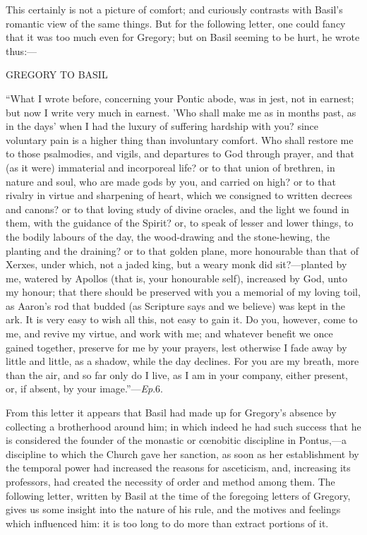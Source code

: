 This certainly is not a picture of comfort; and curiously contrasts
with Basil's romantic view of the same things. But for the following
letter, one could fancy that it was too much even for Gregory; but on
Basil seeming to be hurt, he wrote thus:—

GREGORY TO BASIL

``What I wrote before, concerning your Pontic abode, was in
jest, not in earnest; but now I write very much in earnest. 'Who shall
make me as in months past, as in the days' when I had the luxury of
suffering hardship with you? since voluntary pain is a higher thing
than involuntary comfort. Who shall restore me to those psalmodies,
and vigils, and departures to God through prayer, and that (as it
were) immaterial and incorporeal life? or to that union of brethren,
in nature and soul, who are made gods by you, and
carried on high? or to that rivalry in virtue and sharpening of heart,
which we consigned to written decrees and canons? or to that loving
study of divine oracles, and the light we found in them, with the
guidance of the Spirit? or, to speak of lesser and lower things, to
the bodily labours of the day, the wood-drawing and the stone-hewing,
the planting and the draining? or to that golden plane, more
honourable than that of Xerxes, under which, not a jaded king, but a
weary monk did sit?—planted by me, watered by Apollos (that is, your
honourable self), increased by God, unto my honour; that there should
be preserved with you a memorial of my loving toil, as Aaron's rod
that budded (as Scripture says and we believe) was kept in the ark. It
is very easy to wish all this, not easy to gain it. Do you, however,
come to me, and revive my virtue, and work with me; and whatever
benefit we once gained together, preserve for me by your prayers, lest
otherwise I fade away by little and little, as a shadow, while the day
declines. For you are my breath, more than the air, and so far only do
I live, as I am in your company, either present, or, if absent, by
your image.''—\emph{Ep}.6.

From this letter it appears that Basil had made up for Gregory's
absence by collecting a brotherhood around him; in which indeed he had
such success that he is considered the founder of the monastic or cœnobitic
discipline in Pontus,—a discipline to which the Church gave her
sanction, as soon as her establishment by the temporal power had
increased the reasons for asceticism, and, increasing its professors,
had created the necessity of order and method among them. The
following letter, written by Basil at the time of the foregoing
letters of Gregory, gives us some insight into the nature of his rule,
and the motives and feelings which influenced him: it is too long to
do more than extract portions of it.

